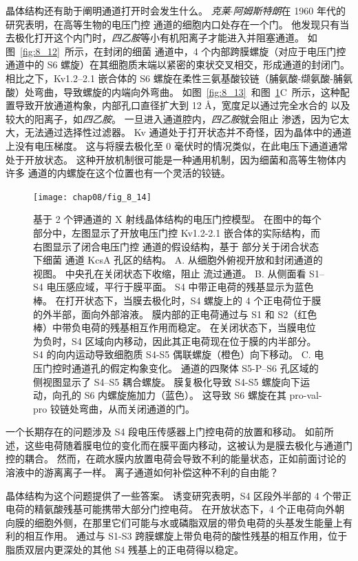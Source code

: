 晶体结构还有助于阐明通道打开时会发生什么。
\textit{克莱$\cdot$阿姆斯特朗}在 1960 年代的研究表明，在高等生物的电压门控  通道的细胞内口处存在一个门。
他发现只有当去极化打开这个内门时，\textit{四乙胺}等小有机阳离子才能进入并阻塞通道。
如图~\ref{fig:8_12}~所示，在封闭的细菌  通道中，4 个内部跨膜螺旋（对应于电压门控  通道中的 S6 螺旋）在其细胞质末端以紧密的束状交叉相交，形成通道的封闭门。
相比之下，Kv1.2–2.1 嵌合体的 S6 螺旋在柔性三氨基酸铰链（脯氨酸-缬氨酸-脯氨酸）处弯曲，导致螺旋的内端向外弯曲。
如图~\ref{fig:8_13}~和图~\ref{fig:8_14}C~所示，这种配置导致开放通道构象，内部孔口直径扩大到 12 Å，宽度足以通过完全水合的  以及较大的阳离子，如\textit{四乙胺}。
一旦进入通道腔内，\textit{四乙胺}就会阻止  渗透，因为它太大，无法通过选择性过滤器。
Kv 通道处于打开状态并不奇怪，因为晶体中的通道上没有电压梯度。
这与将膜去极化至 0 毫伏时的情况类似，在此电压下通道通常处于开放状态。
这种开放机制很可能是一种通用机制，因为细菌和高等生物体内许多  通道的内螺旋在这个位置也有一个灵活的铰链。


\begin{figure}[htbp]
	\centering
	\texttt{[image: chap08/fig\_8\_14]}
	\caption{基于 2 个钾通道的 X 射线晶体结构的电压门控模型。
		在图中的每个部分中，左图显示了开放电压门控 Kv1.2-2.1 嵌合体的实际结构，而右图显示了闭合电压门控  通道的假设结构，基于 部分关于闭合状态下细菌  通道 KcsA 孔区的结构。
		A. 从细胞外俯视开放和封闭通道的视图。
		中央孔在关闭状态下收缩，阻止  流过通道。
		B. 从侧面看 S1–S4 电压感应域，平行于膜平面。
		S4 中带正电荷的残基显示为蓝色棒。
		在打开状态下，当膜去极化时，S4 螺旋上的 4 个正电荷位于膜的外半部，面向外部溶液。
		膜内部的正电荷通过与 S1 和 S2（红色棒）中带负电荷的残基相互作用而稳定。
		在关闭状态下，当膜电位为负时，S4 区域向内移动，因此其正电荷现在位于膜的内半部分。
		S4 的向内运动导致细胞质 S4-S5 偶联螺旋（橙色）向下移动。
		C. 电压门控时通道孔的假定构象变化。
		通道的四聚体 S5-P–S6 孔区域的侧视图显示了 S4–S5 耦合螺旋。
		膜复极化导致 S4-S5 螺旋向下运动，向孔的 S6 内螺旋施加力（蓝色）。
		这导致 S6 螺旋在其 pro-val-pro 铰链处弯曲，从而关闭通道的门。}
	\label{fig:8_14}
\end{figure}


一个长期存在的问题涉及 S4 段电压传感器上门控电荷的放置和移动。
如前所述，这些电荷随着膜电位的变化而在膜平面内移动，这被认为是膜去极化与通道门控的耦合。
然而，在疏水膜内放置电荷会导致不利的能量状态，正如前面讨论的溶液中的游离离子一样。
离子通道如何补偿这种不利的自由能？


晶体结构为这个问题提供了一些答案。
诱变研究表明，S4 区段外半部的 4 个带正电荷的精氨酸残基可能携带大部分门控电荷。
在开放状态下，4 个正电荷向外朝向膜的细胞外侧，在那里它们可能与水或磷脂双层的带负电荷的头基发生能量上有利的相互作用。
通过与 S1-S3 跨膜螺旋上带负电荷的酸性残基的相互作用，位于脂质双层内更深处的其他 S4 残基上的正电荷得以稳定。


